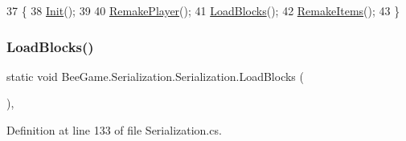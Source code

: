 \begin{DoxyCode}
37         \{
38             \hyperlink{class_bee_game_1_1_serialization_1_1_serialization_afefd28e9eab4d1ce6c61ed03b724902d}{Init}();
39 
40             \hyperlink{class_bee_game_1_1_serialization_1_1_serialization_ac2d321fdd05f08085eefcb8f62c6baf0}{RemakePlayer}();
41             \hyperlink{class_bee_game_1_1_serialization_1_1_serialization_a3641370fc2ffea0db839cf7faf6c3efb}{LoadBlocks}();
42             \hyperlink{class_bee_game_1_1_serialization_1_1_serialization_af06c3b4c0c2baa92fce21403e4fc5372}{RemakeItems}();
43         \}
\end{DoxyCode}
\mbox{\label{class_bee_game_1_1_serialization_1_1_serialization_a3641370fc2ffea0db839cf7faf6c3efb}} 
\subsubsection{\texorpdfstring{Load\+Blocks()}{LoadBlocks()}}
{\footnotesize\ttfamily static void Bee\+Game.\+Serialization.\+Serialization.\+Load\+Blocks (\begin{DoxyParamCaption}{ }\end{DoxyParamCaption})\hspace{0.3cm}{\ttfamily [static]}, {\ttfamily [private]}}



Definition at line 133 of file Serialization.\+cs.



